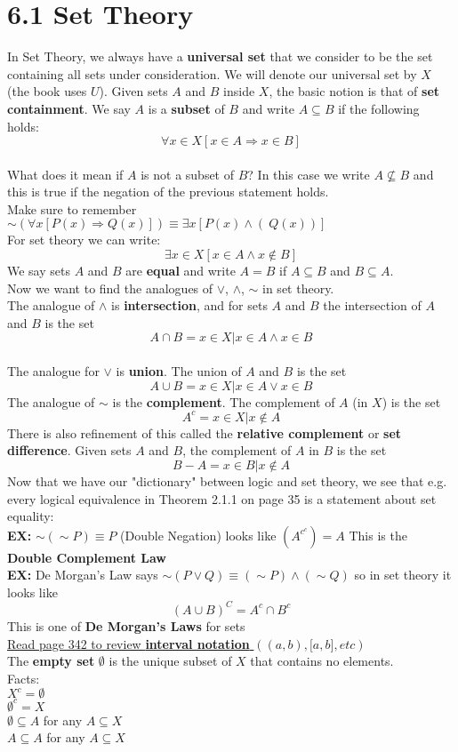 \documentclass{article}
\begin{document}
		\section[03/29/18]{6.1 Set Theory}
		In Set Theory, we always have a \textbf{universal set} that we consider to be the set containing all sets under consideration. We will denote our universal set by $X$ (the book uses $U$). Given sets $A$ and $B$ inside $X$, the basic notion is that of \textbf{set containment}. We say $A$ is a \textbf{subset} of $B$ and write $A\subseteq B$ if the following holds:
		$$\forall x\in X[x\in A \Rightarrow x\in B]$$
		\\
		What does it mean if $A$ is not a subset of $B$? In this case we write $A\nsubseteq B$ and this is true if the negation of the previous statement holds.\\
		Make sure to remember $\sim (\forall x [P(x) \Rightarrow Q(x)])\equiv \exists x[P(x)\wedge (~Q(x))]$\\
		For set theory we can write:
		$$\exists x\in X[x\in A \wedge x \notin B]$$
		We say sets $A$ and $B$ are \textbf{equal} and write $A=B$ if $A\subseteq B$ and $B\subseteq A$.\\
		Now we want to find the analogues of $\vee$, $\wedge$, $\sim$ in set theory.\\
		 The analogue of $\wedge$ is \textbf{intersection}, and for sets $A$ and $B$ the intersection of $A$ and $B$ is the set 
		$$A\cap B = {x\in X|x\in A \wedge x\in B}$$\\
		The analogue for $\vee$ is \textbf{union}. The union of $A$ and $B$ is the set 
		$$A\cup B = {x\in X|x \in A \vee x\in B}$$
		The analogue of $\sim$ is the \textbf{complement}. The complement of $A$ (in $X$) is the set
		$$A^c={x\in X|x\notin A}$$
		There is also refinement of this called the \textbf{relative complement} or \textbf{set difference}. Given sets $A$ and $B$, the complement of $A$ in $B$ is the set 
		$$B-A={x\in B| x\notin A}$$
		Now that we have our "dictionary" between logic and set theory, we see that e.g. every logical equivalence in Theorem 2.1.1 on page 35 is a statement about set equality:\\
		\textbf{EX:} $\sim (\sim P) \equiv P$ (Double Negation)
		looks like $(A^{c^c})=A$ This is the \textbf{Double Complement Law}\\
		\textbf{EX:} De Morgan's Law says $\sim (P\vee Q)\equiv (\sim P)\wedge (\sim Q)$ so in set theory it looks like 
		$$(A\cup B)^C= A^c\cap B^c$$
		This is one of \textbf{De Morgan's Laws} for sets\\
		\underline{Read page 342 to review \textbf{interval notation} $((a,b),\lbrack a,b\rbrack,etc)$}\\
		The \textbf{empty set} $\emptyset $ is the unique subset of $X$ that contains no elements.\\
		Facts:\\
		$X^c=\emptyset$\\
		$\emptyset ^c=X$\\
		$\emptyset\subseteq A$ for any $A\subseteq X$\\
		$A\subseteq A$ for any $A\subseteq X$\\
		
\end{document}
